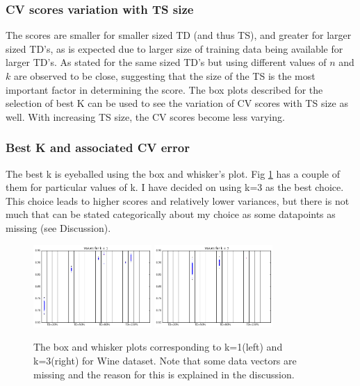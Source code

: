 \documentclass[5pt]{article}
\begin{document}
\subsubsection{CV scores variation with TS size}
The scores are smaller for smaller sized TD (and thus TS), and greater for
larger sized TD's, as is expected due to larger size of training data being
available for larger TD's. As stated for the same sized TD's but using
different values of $n$ and $k$ are observed to be close, suggesting that the
size of the TS is the most important factor in determining the score. The box
plots described for the selection of best K can be used to see the variation of
CV scores with TS size as well. With increasing TS size, the CV scores become
less varying.

\subsubsection{Best K and associated CV error}
The best k is eyeballed using the box and whisker's plot. Fig
\ref{fig:boxplotsWine} has a couple of them for particular values of k. I have
decided on using k=3 as the best choice. This choice leads to higher scores and
relatively lower variances, but there is not much that can be stated
categorically about my choice as some datapoints as missing (see Discussion).


\begin{figure}[h]
  \center{}
  \includegraphics[width=0.4\textwidth]{images/wineBoxK1.png}
  \includegraphics[width=0.4\textwidth]{images/wineBoxK2.png}
  \caption{The box and whisker plots corresponding to k=1(left) and k=3(right)
    for Wine dataset. Note that some data vectors are missing and the reason
    for this is explained in the discussion.}
\label{fig:boxplotsWine} 
\end{figure}
\end{document}
